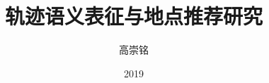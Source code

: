 \documentclass[master]{uestcthesis}
\title{轨迹语义表征与地点推荐研究}
\author{高崇铭}
\date{2019}{2}{14}
\begin{document}
\newcommand{\red}[1]{{\textcolor{red}{{} #1}}}
\newcommand{\ud}{\,\mathrm{d}}
\newcommand{\bt}{\vrule width 0.85pt}
\newcommand{\CoSync}{CoSync}
\newcommand{\Sync}{Sync}
\newcommand{\cosync}{CoSync}
\newcommand{\sync}{Sync}
\makeatletter
\def\hlinew#1{%
  \noalign{\ifnum0=`}\fi\hrule \@height #1 \futurelet
   \reserved@a\@xhline}





% 
% 
% 
\end{document}
